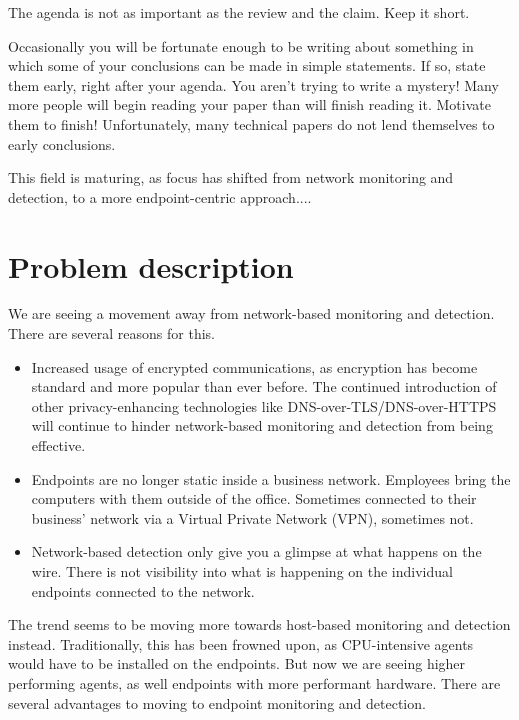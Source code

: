 The agenda is not as important as the review and the claim. Keep it short.

Occasionally you will be fortunate enough to be writing about something in which some of your conclusions can be made in simple statements. If so, state them early, right after your agenda. You aren't trying to write a mystery! Many more people will begin reading your paper than will finish reading it. Motivate them to finish! Unfortunately, many technical papers do not lend themselves to early conclusions.
\fi
\iffalse
In this thesis, I will first give some background into the field of correlating event technologies, and give an overview of the state-of-the-art. Then I will explain the methods I have used to measure and analyze our results. After this, I will go into detail on our results, before we then discuss and analyse our results. Finally, I will conclude with some further work to be done.


\makebox[\linewidth]{\rule{\paperwidth}{0.4pt}}
\fi

This field is maturing, as focus has shifted from network monitoring and detection, to a more endpoint-centric approach....

\section{Problem description}
\label{sec:problemdescription}

We are seeing a movement away from network-based monitoring and detection. There are several reasons for this.

\begin{itemize}
    \item Increased usage of encrypted communications, as encryption has become standard and more popular than ever before. The continued introduction of other privacy-enhancing technologies like DNS-over-TLS/DNS-over-HTTPS will continue to hinder network-based monitoring and detection from being effective.
    \item Endpoints are no longer static inside a business network. Employees bring the computers with them outside of the office. Sometimes connected to their business' network via a Virtual Private Network (VPN), sometimes not.
    \item Network-based detection only give you a glimpse at what happens on the wire. There is not visibility into what is happening on the individual endpoints connected to the network.
\end{itemize}
The trend seems to be moving more towards host-based monitoring and detection instead. Traditionally, this has been frowned upon, as CPU-intensive agents would have to be installed on the endpoints. But now we are seeing higher performing agents, as well endpoints with more performant hardware. There are several advantages to moving to endpoint monitoring and detection.

